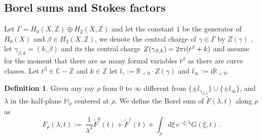 \documentclass[a4paper,12pt,justification=centering]{article}
\numberwithin{equation}{section}
\newcommand{\ii}{\textnormal{i}}
\newcommand{\I}{{\mathrm i}}
\theoremstyle{plain}%
\theoremstyle{definition}
\newtheorem{dfn}[thm]{Definition}
\begin{document}
\subsection{Borel sums and Stokes factors}

Let  $\Gamma= H_0(X,\mathbb{Z})\oplus H_2(X,\mathbb{Z})$ and let the constant $1$ be the generator of $H_0(X)$ and $\beta\in H_{2}(X,\mathbb{Z})$, we denote the central charge of $\gamma\in\Gamma$ by $Z(\gamma)$ , let $\gamma_{\beta,k}=(k,\beta)$ and its  the central charge $Z(\gamma_{\beta,k})=2\pi\ii (t^{\beta}+k)$ and assume for the moment that there are as many formal variables $t^{\beta}$ as there are curve classes. Let   $t^{\beta}\in \mathbb{C}-\mathbb{Z}$ and  $k\in \mathbb{Z}$ let $l_{\gamma}:=\mathbb{R}_{<0}\cdot Z(\gamma)$ and $l_{\infty}:=\I\mathbb{R}_{<0}$. 
\begin{dfn}
Given any ray $\rho$ from $0$ to $\infty$ different from $\{\pm l_{\gamma_{\beta,k}}\} \cup \{\pm l_{\infty}\}$, and $\lambda$ in the half-plane $\mathbb{H}_{\rho}$ centered at $\rho$. We define the Borel sum of $\widetilde{F}(\lambda,t)$ along $\rho$ as
\begin{equation}\label{BorelS}
    F_{\rho}(\lambda,t):=\ \frac{1}{\lambda^2} \widetilde{F}^0(t) + \widetilde{F}^1(t) +\int_{\rho}\mathrm d\xi\, e^{-\xi/\check{\lambda}} G(\xi,t)\,.
\end{equation}
\end{dfn}
\end{document}
